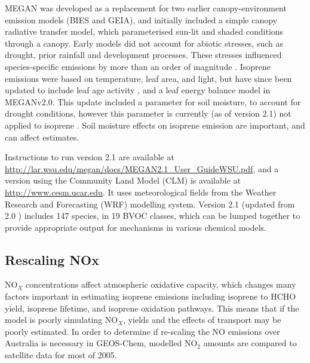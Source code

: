     MEGAN was developed as a replacement for two earlier canopy-environment emission models (BIES and GEIA), and initially included a simple canopy radiative transfer model, which parameterised sun-lit and shaded conditions through a canopy.
    Early models did not account for abiotic stresses, such as drought, prior rainfall and development processes. These stresses influenced species-specific emissions by more than an order of magnitude \parencite{Niinemets1999}.
    Isoprene emissions were based on temperature, leaf area, and light, but have since been updated to include leaf age activity \parencite{Guenther2000}, and a leaf energy balance model \parencite{Guenther2006} in MEGANv2.0.
    This update included a parameter for soil moisture, to account for drought conditions, however this parameter is currently (as of version 2.1) not applied to isoprene \parencite{Sindelarova2014}.
    Soil moisture effects on isoprene emission are important, and can affect estimates.
    
    Instructions to run version 2.1 are available at \url{http://lar.wsu.edu/megan/docs/MEGAN2.1_User_GuideWSU.pdf}, and a version using the Community Land Model (CLM) is available at \url{http://www.cesm.ucar.edu}.
    It uses meteorological fields from the Weather Research and Forecasting (WRF) modelling system.
    Version 2.1 (updated from 2.0 \parencite{Guenther2006}) includes 147 species, in 19 BVOC classes, which can be lumped together to provide appropriate output for mechanisms in various chemical models.
  
  \subsection{Rescaling NOx}
  
    NO$_X$ concentrations affect atmospheric oxidative capacity, which changes many factors important in estimating isoprene emissions including isoprene to HCHO yield, isoprene lifetime, and isoprene oxidation pathways.
    This means that if the model is poorly simulating NO$_X$, yields and the effects of transport may be poorly estimated.
    In order to determine if re-scaling the NO emissions over Australia is necessary in GEOS-Chem, modelled NO$_2$ amounts are compared to satellite data for most of 2005.
    
